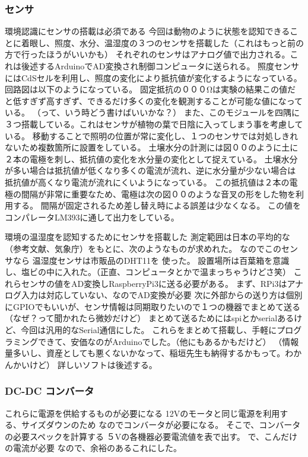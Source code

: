 \subsubsection{センサ}
環境認識にセンサの搭載は必須である
今回は動物のように状態を認知できることに着眼し、照度、水分、温湿度の３つのセンサを搭載した（これはもっと前の方で行ったほうがいいかも）
それぞれのセンサはアナログ値で出力される。これは後述するArduinoでAD変換され制御コンピュータに送られる。
照度センサにはCdSセルを利用し、照度の変化により抵抗値が変化するようになっている。
回路図は以下のようになっている。
固定抵抗の０００Ωは実験の結果この値だと低すぎず高すぎず、できるだけ多くの変化を観測することが可能な値になっている。
（って、いう時どう書けばいいかな？）
また、このモジュールを四隅に３つ搭載している。これはセンサが植物の葉で日陰に入ってしまう事を考慮している。
移動することで照明の位置が常に変化し、１つのセンサでは対処しきれないため複数箇所に設置をしている。
土壌水分の計測には図００のように土に２本の電極を刺し、抵抗値の変化を水分量の変化として捉えている。
土壌水分が多い場合は抵抗値が低くなり多くの電流が流れ、逆に水分量が少ない場合は抵抗値が高くなり電流が流れにくいようになっている。
この抵抗値は２本の電極の間隔が非常に重要なため、電極は次の図００のような音叉の形をした物を利用する。
間隔が固定されるため差し替え時による誤差は少なくなる。
この値をコンパレータLM393に通して出力をしている。

環境の温湿度を認知するためにセンサを搭載した
測定範囲は日本の平均的な（参考文献、気象庁）をもとに、次のようなものが求めれた。
なのでこのセンサなら
温湿度センサは市販品のDHT11を
使った。
設置場所は百葉箱を意識し、塩ビの中に入れた。（正直、コンピュータとかで温まっちゃうけどさ笑）
これらセンサの値をAD変換しRaspberryPi3に送る必要がある。
まず、RPi3はアナログ入力は対応していない、なのでAD変換が必要
次に外部からの送り方は個別にGPIOでもいいが、センサ情報は同期取りたいので１つの機器でまとめて送る（なぜ？って聞かれたら微妙だけど）
まとめて送るためにはspiとかserialあるけど、今回は汎用的なSerial通信にした。
これらをまとめて搭載し、手軽にプログラミングできて、安価なのがArduinoでした。（他にもあるかもだけど）
（情報量多いし、資産としても悪くないかなって、稲垣先生も納得するかもって。わかんかいけど）
詳しいソフトは後述する。
\subsubsection{DC-DC コンバータ}
これらに電源を供給するものが必要になる
12Vのモータと同じ電源を利用する、サイズダウンのため
なのでコンバータが必要になる。
そこで、コンバータの必要スペックを計算する
５Vの各機器必要電流値を表で出す。
で、こんだけの電流が必要
なので、余裕のあるこれにした。
